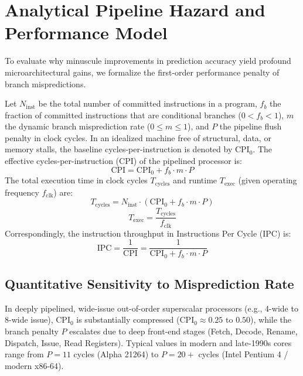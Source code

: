 \documentclass[11pt,a4paper]{article}
\begin{document}
\section{Analytical Pipeline Hazard and Performance Model}
\label{sec:perf_model}

To evaluate why minuscule improvements in prediction accuracy yield profound microarchitectural gains, we formalize the first-order performance penalty of branch mispredictions.

Let $N_{\text{inst}}$ be the total number of committed instructions in a program, $f_b$ the fraction of committed instructions that are conditional branches ($0 < f_b < 1$), $m$ the dynamic branch misprediction rate ($0 \le m \le 1$), and $P$ the pipeline flush penalty in clock cycles. In an idealized machine free of structural, data, or memory stalls, the baseline cycles-per-instruction is denoted by $\text{CPI}_0$. The effective cycles-per-instruction ($\text{CPI}$) of the pipelined processor is:
\begin{equation}
    \text{CPI} = \text{CPI}_0 + f_b \cdot m \cdot P
    \label{eq:cpi}
\end{equation}
The total execution time in clock cycles $T_{\text{cycles}}$ and runtime $T_{\text{exec}}$ (given operating frequency $f_{\text{clk}}$) are:
\begin{equation}
    T_{\text{cycles}} = N_{\text{inst}} \cdot \left(\text{CPI}_0 + f_b \cdot m \cdot P\right)
    \label{eq:t_cycles}
\end{equation}
\begin{equation}
    T_{\text{exec}} = \frac{T_{\text{cycles}}}{f_{\text{clk}}}
    \label{eq:exec_time}
\end{equation}
Correspondingly, the instruction throughput in Instructions Per Cycle ($\text{IPC}$) is:
\begin{equation}
    \text{IPC} = \frac{1}{\text{CPI}} = \frac{1}{\text{CPI}_0 + f_b \cdot m \cdot P}
    \label{eq:ipc}
\end{equation}

\subsection{Quantitative Sensitivity to Misprediction Rate}
In deeply pipelined, wide-issue out-of-order superscalar processors (e.g., 4-wide to 8-wide issue), $\text{CPI}_0$ is substantially compressed ($\text{CPI}_0 \approx 0.25$ to $0.50$), while the branch penalty $P$ escalates due to deep front-end stages (Fetch, Decode, Rename, Dispatch, Issue, Read Registers). Typical values in modern and late-1990s cores range from $P = 11$ cycles (Alpha 21264) to $P = 20+$ cycles (Intel Pentium 4 / modern x86-64).
\end{document}
